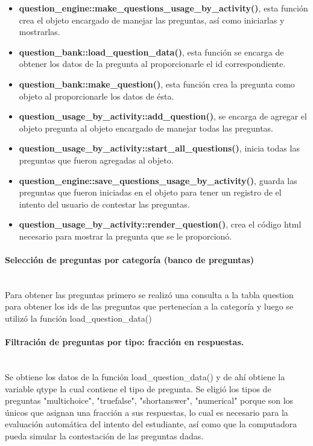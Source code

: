     \begin{itemize}

				\item {\bf question\_engine::make\_questions\_usage\_by\_activity()}, esta función crea el objeto encargado de manejar las preguntas, así como iniciarlas y mostrarlas.
				\item {\bf question\_bank::load\_question\_data()}, esta función se encarga de obtener los datos de la pregunta al proporcionarle el id correspondiente.
				\item {\bf question\_bank::make\_question()}, esta función crea la pregunta como objeto al proporcionarle los datos de ésta.
				\item {\bf question\_usage\_by\_activity::add\_question()}, se encarga de agregar el objeto pregunta al objeto encargado de manejar todas las preguntas.
				\item {\bf question\_usage\_by\_activity::start\_all\_questions()}, inicia todas las preguntas que fueron agregadas al objeto.
				\item {\bf question\_engine::save\_questions\_usage\_by\_activity()}, guarda las preguntas que fueron iniciadas en el objeto para tener un registro de el intento del usuario de contestar las preguntas.
				\item {\bf question\_usage\_by\_activity::render\_question()}, crea el código html necesario para mostrar la pregunta que se le proporcionó.

      \end{itemize}

		\paragraph{Selección de preguntas por categoría (banco de preguntas)}\mbox{}\\

			Para obtener las preguntas primero se realizó una consulta a la tabla question para obtener los ids de las preguntas que pertenecían a la categoría y luego se utilizó la función load\_question\_data()

    \paragraph{Filtración de preguntas por tipo: fracción en respuestas.}\mbox{}\\

			Se obtiene los datos de la función load\_question\_data() y de ahí obtiene la variable qtype la cual contiene el tipo de pregunta. Se eligió los tipos de preguntas "multichoice", "truefalse", "shortanswer", "numerical" porque son los únicos que asignan una fracción a sus respuestas, lo cual es necesario para la evaluación automática del intento del estudiante, así como que la computadora pueda simular la contestación de las preguntas dadas.

